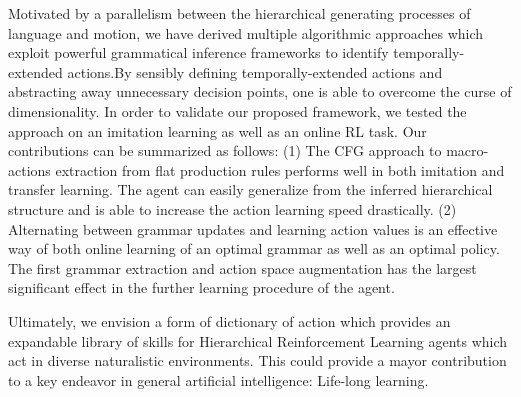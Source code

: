 \documentclass[10pt,letterpaper]{article}
\begin{document}
Motivated by a parallelism between the hierarchical generating processes of language and motion, we have derived multiple algorithmic approaches which exploit powerful grammatical inference frameworks to identify temporally-extended actions.By sensibly defining temporally-extended actions and abstracting away unnecessary decision points, one is able to overcome the curse of dimensionality. 
In order to validate our proposed framework, we tested the approach on an imitation learning as well as an online RL task. Our contributions can be summarized as follows:
%
(1) The CFG approach to macro-actions extraction from flat production rules performs well in both imitation and transfer learning. The agent can easily generalize from the inferred hierarchical structure and is able to increase the action learning speed drastically.
%
(2) Alternating between grammar updates and learning action values is an effective way of both online learning of an optimal grammar as well as an optimal policy. The first grammar extraction and action space augmentation has the largest significant effect in the further learning procedure of the agent. 

%
%
%
Ultimately, we envision a form of dictionary of action which provides an expandable library of skills for Hierarchical Reinforcement Learning agents which act in diverse naturalistic environments. This could provide a mayor contribution to a key endeavor in general artificial intelligence: Life-long learning.

\newpage


\setlength{\bibleftmargin}{.125in}
\setlength{\bibindent}{-\bibleftmargin}


\end{document}
